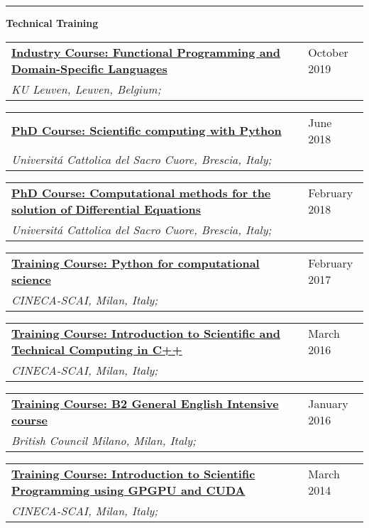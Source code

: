 \documentclass[a4paper]{article}
\newcommand{\block}[1]{\hrule \vspace{0.2cm} \textbf{\Large #1} \vspace{0.2cm}}
\newcommand{\longvoice}[8]{
    \begin{tabular}{p{0.83\linewidth} p{0.17\linewidth} }
        \textbf{\href{#3}{#2: #1}} & #4 
        \\ 
        \textit{#5, #6, #7;} & {\small\emph{#8}}
    \end{tabular}
    \vspace{.5em}
    }
\begin{document}
    \block{Technical Training}
   
    \longvoice{Functional Programming and Domain-Specific Languages}
        {Industry Course}
        {https://dtai.cs.kuleuven.be/events/fpcourse/}
        {October 2019}
        {KU Leuven}
        {Leuven}
        {Belgium}
        {}
    \longvoice{Scientific computing with Python}
        {PhD Course}
        {https://web.archive.org/web/20180604081514/http://dmf.unicatt.it/~della/pythoncourse18/}
        {June 2018}
        {Universit\'a Cattolica del Sacro Cuore}
        {Brescia}
        {Italy}
        {}
    \longvoice{Computational methods for the solution of Differential Equations}
        {PhD Course}
        {https://www.dropbox.com/s/q2rapau2k49n5t7/1802-Course-NumericalPdeAvella.pdf?dl=0}
        {February 2018}
        {Universit\'a Cattolica del Sacro Cuore}
        {Brescia}
        {Italy}
        {}
    \longvoice{Python for computational science}
        {Training Course}
        {https://web.archive.org/web/20170623170252/https://eventi.cineca.it/en/hpc/python-computational-science}
        {February 2017}
        {CINECA-SCAI}
        {Milan}
        {Italy}
        {}
    \longvoice{Introduction to Scientific and Technical Computing in C++}
        {Training Course}
        {https://web.archive.org/save/http://www.hpc.cineca.it/content/introduction-object-oriented}
        {March 2016}
        {CINECA-SCAI}
        {Milan}
        {Italy}
        {}
    \longvoice{B2 General English Intensive course}
        {Training Course}
        {https://www.britishcouncil.it/en/english/courses-adults/general}
        {January 2016}
        {British Council Milano}
        {Milan}
        {Italy}
        {}
    \longvoice{Introduction to Scientific Programming using GPGPU and CUDA}
        {Training Course}
        {https://web.archive.org/web/20170623171128/http://www.hpc.cineca.it/content/introduction-to-gpu}
        {March 2014}
        {CINECA-SCAI}
        {Milan}
        {Italy}
        {}
    
\end{document}
